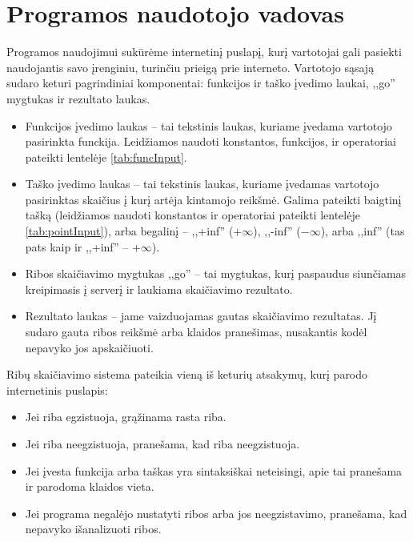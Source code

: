 \section{Programos naudotojo vadovas}

	Programos naudojimui sukūrėme internetinį puslapį, kurį vartotojai gali pasiekti 
	naudojantis savo įrenginiu, turinčiu prieigą prie interneto.
	Vartotojo sąsają sudaro keturi pagrindiniai komponentai: funkcijos ir taško įvedimo laukai, ,,go'' mygtukas ir rezultato laukas.
	
	\begin{itemize}
		\item Funkcijos įvedimo laukas -- tai tekstinis laukas, kuriame įvedama vartotojo pasirinkta funckija. Leidžiamos
			naudoti konstantos, funkcijos, ir operatoriai pateikti lentelėje \ref{tab:funcInput}.
		\item Taško įvedimo laukas -- tai tekstinis laukas, kuriame įvedamas vartotojo pasirinktas skaičius į kurį artėja
			kintamojo reikšmė. Galima pateikti baigtinį tašką (leidžiamos naudoti konstantos ir operatoriai pateikti
			lentelėje \ref{tab:pointInput}), arba begalinį -- ,,+inf'' ($+\infty$), ,,-inf'' ($-\infty$), arba ,,inf''
			(tas pats kaip ir ,,+inf'' -- $+\infty$).
		\item Ribos skaičiavimo mygtukas ,,go'' -- tai mygtukas, kurį paspaudus siunčiamas kreipimasis į serverį ir laukiama skaičiavimo rezultato.
		\item Rezultato laukas -- jame vaizduojamas gautas skaičiavimo rezultatas. 
		Jį sudaro gauta ribos reikšmė arba klaidos pranešimas, nusakantis kodėl nepavyko jos apskaičiuoti.
	\end{itemize}
	
	Ribų skaičiavimo sistema pateikia vieną iš keturių atsakymų, kurį parodo internetinis puslapis:

	\begin{itemize}
		\item Jei riba egzistuoja, grąžinama rasta riba.
		\item Jei riba neegzistuoja, pranešama, kad riba neegzistuoja.
		\item Jei įvesta funkcija arba taškas yra sintaksiškai neteisingi, apie tai pranešama ir parodoma klaidos vieta.
		\item Jei programa negalėjo nustatyti ribos arba jos neegzistavimo, pranešama, kad nepavyko išanalizuoti ribos.
	\end{itemize}
	
